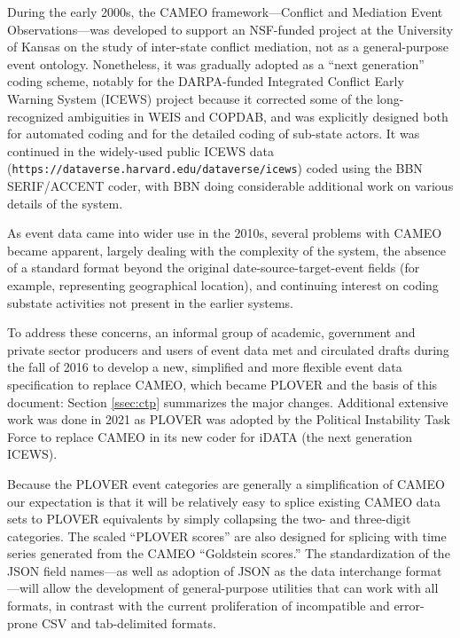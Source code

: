 \documentclass[11pt]{report}
\newcommand{\txt}[1]{\texttt{#1}}
\begin{document}
During the early 2000s, the CAMEO framework---Conflict and Mediation Event Observations---was developed \citep{SGY09} to support an NSF-funded project at the University of Kansas on the study of inter-state conflict mediation, not as a general-purpose event ontology. Nonetheless, it was gradually adopted as a ``next generation'' coding scheme, notably for the DARPA-funded Integrated Conflict Early Warning System (ICEWS) project \citep{OBrien10} because it corrected some of the long-recognized ambiguities in WEIS and COPDAB, and was explicitly designed both for automated coding and for the detailed coding of sub-state actors. It was continued in the widely-used public ICEWS data (\txt{https://dataverse.harvard.edu/dataverse/icews}) coded using the BBN SERIF/ACCENT coder, with BBN doing considerable additional work on various details of the system.

As event data came into wider use in the 2010s, several problems with CAMEO became apparent, largely dealing with the complexity of the system, the absence of a standard format beyond the original  date-source-target-event fields (for example, representing geographical location), and continuing interest on coding substate activities not present in the earlier systems.

To address these concerns, an informal group of academic, government and private sector producers and users of event data met and circulated drafts during the fall of 2016 to develop a new, simplified and more flexible event data specification to replace CAMEO, which became PLOVER and the basis of this document: Section \ref{ssec:ctp} summarizes the major changes. Additional extensive
work was done in 2021 as PLOVER was adopted by the Political Instability Task Force to replace
CAMEO in its new coder for iDATA (the next generation ICEWS).

Because the PLOVER event categories are generally a simplification of CAMEO our expectation is that it will be relatively easy to splice existing CAMEO data sets to PLOVER equivalents by simply collapsing the two- and three-digit categories. The scaled ``PLOVER scores'' are also designed for splicing with time series generated from the CAMEO ``Goldstein scores.'' The standardization of the JSON field names---as well as adoption of JSON as the data interchange format---will allow the development of general-purpose utilities that can work with all formats, in contrast with the current proliferation of incompatible and error-prone CSV and tab-delimited formats.
\end{document}
